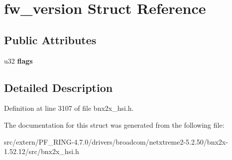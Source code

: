 \hypertarget{structfw__version}{
\section{fw\_\-version Struct Reference}
\label{structfw__version}
}
\subsection*{Public Attributes}
\begin{DoxyCompactItemize}
\item 
\hypertarget{structfw__version_a139bbc7e9090cf0951bf3805c365152c}{
u32 {\bfseries flags}}
\label{structfw__version_a139bbc7e9090cf0951bf3805c365152c}

\end{DoxyCompactItemize}


\subsection{Detailed Description}


Definition at line 3107 of file bnx2x\_\-hsi.h.



The documentation for this struct was generated from the following file:\begin{DoxyCompactItemize}
\item 
src/extern/PF\_\-RING-\/4.7.0/drivers/broadcom/netxtreme2-\/5.2.50/bnx2x-\/1.52.12/src/bnx2x\_\-hsi.h\end{DoxyCompactItemize}
